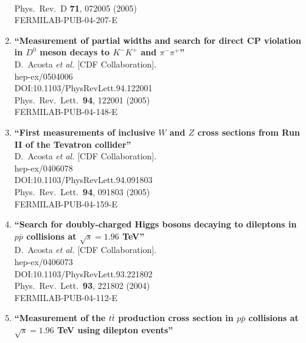 \documentclass{article}
\begin{document}
\begin{enumerate}
  \\{}Phys.\ Rev.\ D {\bf 71}, 072005 (2005)
  \\{}FERMILAB-PUB-04-207-E
\item%
{\bf ``Measurement of partial widths and search for direct CP violation in $D^0$ meson decays to $K^- K^+$ and $\pi^- \pi^+$''}
  \\{}D.~Acosta {\it et al.} [CDF Collaboration].
  \\{}hep-ex/0504006
  \\{}DOI:10.1103/PhysRevLett.94.122001
  \\{}Phys.\ Rev.\ Lett.\  {\bf 94}, 122001 (2005)
  \\{}FERMILAB-PUB-04-148-E
\item%
{\bf ``First measurements of inclusive $W$ and $Z$ cross sections from Run II of the Tevatron collider''}
  \\{}D.~Acosta {\it et al.} [CDF Collaboration].
  \\{}hep-ex/0406078
  \\{}DOI:10.1103/PhysRevLett.94.091803
  \\{}Phys.\ Rev.\ Lett.\  {\bf 94}, 091803 (2005)
  \\{}FERMILAB-PUB-04-159-E
\item%
{\bf ``Search for doubly-charged Higgs bosons decaying to dileptons in $p\bar{p}$ collisions at $\sqrt{s} = 1.96$ TeV''}
  \\{}D.~Acosta {\it et al.} [CDF Collaboration].
  \\{}hep-ex/0406073
  \\{}DOI:10.1103/PhysRevLett.93.221802
  \\{}Phys.\ Rev.\ Lett.\  {\bf 93}, 221802 (2004)
  \\{}FERMILAB-PUB-04-112-E
\item%
{\bf ``Measurement of the $t\bar{t}$ production cross section in $p\bar{p}$ collisions at $\sqrt{s} = 1.96$ TeV using dilepton events''}

\end{enumerate}
\end{document}

